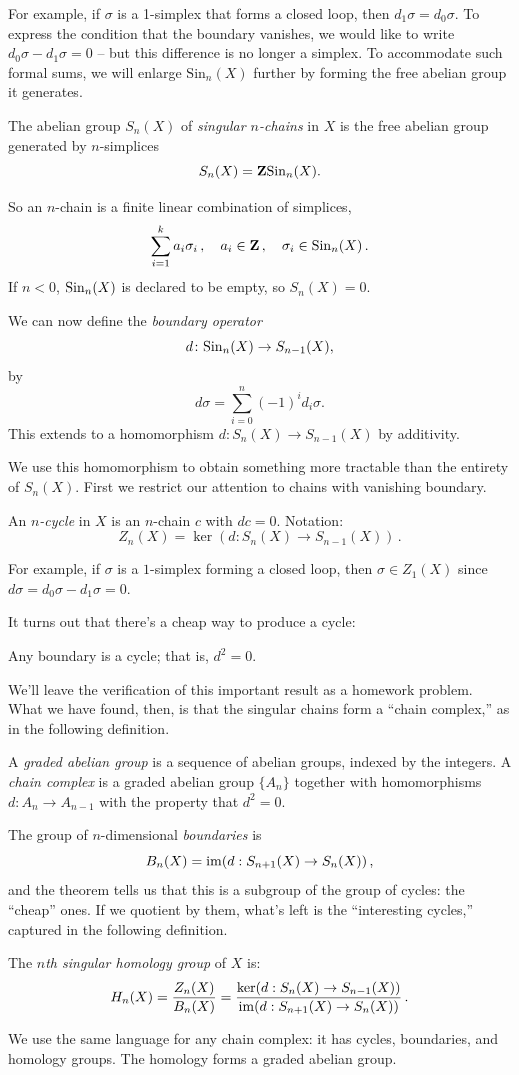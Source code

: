 For example, if $\sigma$ is a 1-simplex that forms a closed loop,
then $d_1\sigma = d_0\sigma$. To express the condition that the boundary vanishes, we would like to write $d_0\sigma - d_1\sigma=0$ -- but this difference is no longer a simplex. To accommodate such formal sums, we will enlarge $\mathrm{Sin}_n(X)$ further by forming the free abelian group it generates.
\begin{definition}
The abelian group $S_n(X)$ of \emph{singular $n$-chains} in $X$ is the free abelian group generated by $n$-simplices
$$S_n(X) = \mathbf{Z}\mathrm{Sin}_n(X).$$
\end{definition}
So an $n$-chain is a finite linear combination of simplices,
\[
\sum_{i=1}^ka_i\sigma_i\,,\quad a_i\in\mathbf{Z}\,,\quad\sigma_i\in\mathrm{Sin}_n(X)\,.
\]
If $n<0$, $\mathrm{Sin}_n(X)$ is declared to be empty, so $S_n(X)=0$. 

We can now define the {\em boundary operator}
$$d\colon \mathrm{Sin}_n(X)\to S_{n-1}(X),$$
by
$$d\sigma = \sum_{i=0}^n(-1)^i d_i\sigma.$$
This extends to a homomorphism $d \colon S_n(X) \to S_{n-1}(X)$ by additivity.

We use this homomorphism to obtain something more tractable than the entirety of $S_n(X)$. First we restrict our attention to chains with vanishing boundary.
\begin{definition}
An \emph{$n$-cycle} in $X$ is an $n$-chain $c$ with $dc = 0$. Notation:
\[
Z_n(X) = \ker(d:S_n(X)\rightarrow S_{n-1}(X))\,.
\]
\end{definition}
For example, if $\sigma$ is a $1$-simplex forming a closed loop, then 
$\sigma\in Z_1(X)$ since $d\sigma = d_0\sigma - d_1\sigma = 0$.

It turns out that there's a cheap way to produce a cycle:
\begin{theorem}
    Any boundary is a cycle; that is, $d^2=0$.
\end{theorem}
We'll leave the verification of this important result as a homework problem. 
What we have found, then, is that the singular chains form a ``chain complex,''
as in the following definition.
\begin{definition}
A {\em graded abelian group} is a sequence of abelian groups, indexed by 
the integers. 
A {\em chain complex} is a graded abelian group $\{A_n\}$ together with 
homomorphisms $d:A_n\to A_{n-1}$ with the property that $d^2=0$.
\end{definition}

The group of $n$-dimensional {\em boundaries} is 
\[
B_n(X) = \operatorname{im}(d:S_{n+1}(X)\to S_n(X))\,,
\]
and the theorem tells us that this is a subgroup of the group of cycles: the
``cheap'' ones. If we quotient by them, what's left is the ``interesting 
cycles,'' captured in the following definition.
\begin{definition}
The \emph{$n$th singular homology group} of $X$ is:
\[
H_n(X) = \frac{Z_n(X)}{B_n(X)} = \frac{\ker(d:S_n(X)\to S_{n-1}(X))}{\operatorname{im}(d:S_{n+1}(X)\to S_n(X))}\,.
\]
\end{definition}
We use the same language for any chain complex: it has cycles, boundaries, and
homology groups. The homology forms a graded abelian group. 

